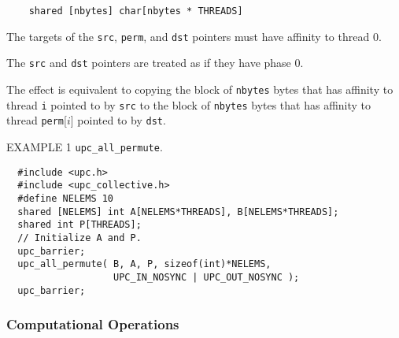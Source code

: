 \begin{verbatim}
    shared [nbytes] char[nbytes * THREADS]
\end{verbatim}  

\np The targets of the {\tt src}, {\tt perm}, and
{\tt dst} pointers must have affinity to thread 0.

\np The {\tt src} and {\tt dst} pointers are treated as
if they have phase 0.

\np The effect is equivalent to copying the block of {\tt nbytes} bytes
that has affinity to thread {\tt i} pointed to by {\tt src}
to the block of {\tt nbytes} bytes
that has affinity to thread {\tt perm}[$i$] pointed to by {\tt dst}.

\np EXAMPLE 1 {\tt upc\_all\_permute}.
\begin{verbatim}
  #include <upc.h>
  #include <upc_collective.h>
  #define NELEMS 10
  shared [NELEMS] int A[NELEMS*THREADS], B[NELEMS*THREADS];
  shared int P[THREADS];
  // Initialize A and P.
  upc_barrier;
  upc_all_permute( B, A, P, sizeof(int)*NELEMS,
                   UPC_IN_NOSYNC | UPC_OUT_NOSYNC );
  upc_barrier;
\end{verbatim}

\subsubsection{Computational Operations}
\label{upc-op-t-section}

